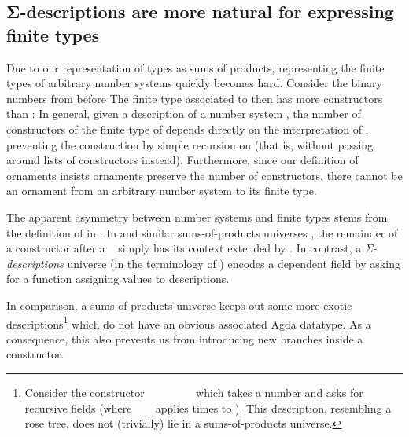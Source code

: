 \subsection{Σ-descriptions are more natural for expressing finite types}\label{sec:closed-universe}
Due to our representation of types as sums of products, representing the finite types of arbitrary number systems quickly becomes hard. Consider the binary numbers from before
The finite type associated to  then has more constructors than :
In general, given a description of a number system , the number of constructors of the finite type  of  depends directly on the interpretation of , preventing the construction  by simple recursion on  (that is, without passing around lists of constructors instead). Furthermore, since our definition of ornaments insists ornaments preserve the number of constructors, there cannot be an ornament from an arbitrary number system to its finite type. 

The apparent asymmetry between number systems and finite types stems from the definition of  in . In  and similar sums-of-products universes \cite{practgen,sijsling}, the remainder of a constructor  after a \  simply has its context extended by . In contrast, a \emph{Σ-descriptions} universe \cite{effectfully,progorn,algorn} (in the terminology of \cite{sijsling}) encodes a dependent field  by asking for a function  assigning values  to descriptions.

In comparison, a sums-of-products universe keeps out some more exotic descriptions\footnote{Consider the constructor \ \bN{}\ \ \ \ \ \ \  which takes a number  and asks for  recursive fields (where \ \ \  applies   times to ). This description, resembling a rose tree, does not (trivially) lie in a sums-of-products universe.} which do not have an obvious associated Agda datatype. As a consequence, this also prevents us from introducing new branches inside a constructor.

